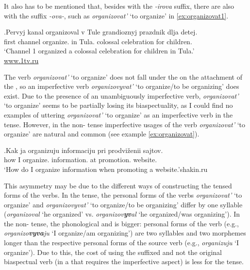 It also has to be mentioned that, besides  with the \mbox{\textit{-irova}} suffix, there are also  with the suffix \textit{-ova-}, such as \textit{organizovat'} `to organize' in \ref{ex:organizovat1}. 

\exg.\label{ex:organizovat1}Pervyj kanal organizoval\textsuperscript{\PF} v Tule grandioznyj prazdnik dlja detej.\\
first channel organize. in Tula. colossal celebration for children.\\
\trans `Channel 1 organized a colossal celebration for children in Tula.'\\\hbox{}\hfill\hbox{\url{www.1tv.ru}}

The verb \textit{organizovat'} `to organize' does not fall under the  on the attachment of the , so an imperfective verb \textit{organizovyvat'}\textsuperscript{\IPF} `to organize/to be organizing' does exist. Due to the presence of an unambiguously imperfective verb, \textit{organizovat'} `to organize' seems to be partially losing its biaspectuality, as I could find no examples of uttering \textit{organizovat'} `to organize' as an imperfective verb in the  tense. However, in the non- tense imperfective usages of the verb \textit{organizovat'} `to organize' are natural and common (see example \ref{ex:organizovat}).

\exg.\label{ex:organizovat}Kak ja organizuju\textsuperscript{\IPF} informaciju pri prodvi\v{z}enii sajtov.\\
how I organize. information. at promotion. website.\\
\trans `How do I organize information when promoting a website.'\hbox{}\hfill\hbox{shakin.ru}

This asymmetry may be due to the different ways of constructing the tensed forms of the verbs. In the  tense, the personal forms of the verbs \textit{organizovat'} `to organize' and \textit{organizovyvat'}\textsuperscript{\IPF} `to organize/to be organizing' differ by one syllable (\textit{organizoval} `he organized' vs. \textit{organizov\textbf{yv}al} `he organized/was organizing'). In the non- tense, the phonological and  is bigger: personal forms of the  verb (e.g., \textit{organizo\textbf{vyva}ju} `I organize/am organizing') are two syllables and two morphemes longer than the respective personal forms of the source verb (e.g., \textit{organizuju} `I organize'). Due to this, the cost of using the suffixed and not the original biaspectual verb (in a  that requires the imperfective aspect) is less for the  tense.

